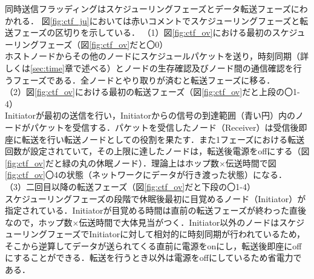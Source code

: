 同時送信フラッディングはスケジューリングフェーズとデータ転送フェーズにわかれる．
図\ref{fig:ctf_ju}においては赤いコメントでスケジューリングフェーズと転送フェーズの区切りを示している．
（1）図\ref{fig:ctf_ov}における最初のスケジューリングフェーズ（図\ref{fig:ctf_ov}だと〇0）\\
ホストノードからその他のノードにスケジュールパケットを送り，時刻同期（詳しくは\ref{sec:time}章で述べる）とノードの生存確認及びノード間の通信確認を行うフェーズである．全ノードとやり取りが済むと転送フェーズに移る．\\

（2）図\ref{fig:ctf_ov}における最初の転送フェーズ（図\ref{fig:ctf_ov}だと上段の〇1-4）\\
Initiatorが最初の送信を行い，Initiatorからの信号の到達範囲（青い円）内のノードがパケットを受信する．パケットを受信したノード（Receiver）は受信後即座に転送を行い転送ノードとしての役割を果たす．また1フェーズにおける転送回数が設定されていて，その上限に達したノードは，転送後電源をoffにする（図\ref{fig:ctf_ov}だと緑の丸の休眠ノード）．理論上はホップ数$\times$伝送時間で図\ref{fig:ctf_ov}〇4の状態（ネットワークにデータが行き渡った状態）になる．\\

（3）二回目以降の転送フェーズ（図\ref{fig:ctf_ov}だと下段の〇1-4）\\
スケジューリングフェーズの段階で休眠後最初に目覚めるノード（Initiator）が指定されている．Initiatorが目覚める時間は直前の転送フェーズが終わった直後なので，ホップ数$\times$伝送時間で大体見当がつく．Initiator以外のノードはスケジューリングフェーズでInitiatorに対して相対的に時刻同期が行われているため，そこから逆算してデータが送られてくる直前に電源をonにし，転送後即座にoffにすることができる．転送を行うとき以外は電源をoffにしているため省電力である．

